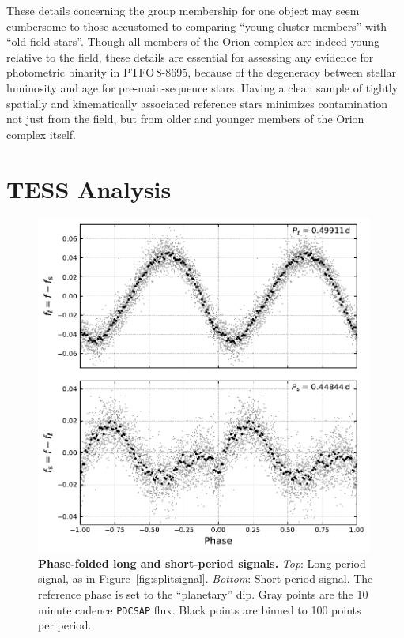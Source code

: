 \documentclass[12pt,twocolumn,tighten]{aastex62}
\newcommand{\ptfo}{PTFO$\,$8-8695}
\begin{document}
These details concerning the group membership for one object may seem
cumbersome to those accustomed to comparing ``young cluster members''
with ``old field stars''.  Though all members of the Orion complex are
indeed young relative to the field, these details are essential for
assessing any evidence for photometric binarity in \ptfo, because of
the degeneracy between stellar luminosity and age for
pre-main-sequence stars.  Having a clean sample of tightly spatially
and kinematically associated reference stars minimizes contamination
not just from the field, but from older and younger members of the
Orion complex itself.


\section{TESS Analysis}
\label{sec:tess}

\begin{figure}[t]
	\begin{center}
		\leavevmode
		\includegraphics[width=0.99\textwidth]{f3.pdf}
	\end{center}
	\vspace{-0.7cm}
	\caption{ {\bf Phase-folded long and short-period signals.}
    {\it Top}: Long-period signal, as in Figure~\ref{fig:splitsignal}.
    {\it Bottom}: Short-period signal. The reference phase is set to
    the ``planetary'' dip.  Gray points are the 10 minute cadence
    \texttt{PDCSAP} flux.  Black points are binned to 100 points per
    period.
		\label{fig:phasefold}
	}
\end{figure}
\end{document}
